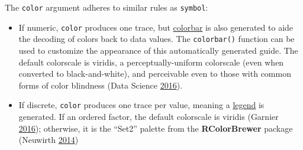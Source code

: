 \documentclass[12pt,]{isuthesis}
\newenvironment{Shaded}{\begin{snugshade}}{\end{snugshade}}
\newcommand{\KeywordTok}[1]{\textcolor[rgb]{0.13,0.29,0.53}{\textbf{{#1}}}}
\newcommand{\DataTypeTok}[1]{\textcolor[rgb]{0.13,0.29,0.53}{{#1}}}
\newcommand{\DecValTok}[1]{\textcolor[rgb]{0.00,0.00,0.81}{{#1}}}
\newcommand{\FloatTok}[1]{\textcolor[rgb]{0.00,0.00,0.81}{{#1}}}
\newcommand{\StringTok}[1]{\textcolor[rgb]{0.31,0.60,0.02}{{#1}}}
\newcommand{\OtherTok}[1]{\textcolor[rgb]{0.56,0.35,0.01}{{#1}}}
\newcommand{\NormalTok}[1]{{#1}}
\begin{document}
The \texttt{color} argument adheres to similar rules as \texttt{symbol}:

\begin{itemize}
\item
  If numeric, \texttt{color} produces one trace, but
  \href{https://plot.ly/r/reference/\#scatter-marker-colorbar}{colorbar}
  is also generated to aide the decoding of colors back to data values.
  The \texttt{colorbar()} function can be used to customize the
  appearance of this automatically generated guide. The default
  colorscale is viridis, a perceptually-uniform colorscale (even when
  converted to black-and-white), and perceivable even to those with
  common forms of color blindness (Data Science
  \protect\hyperlink{ref-viridis}{2016}).
\item
  If discrete, \texttt{color} produces one trace per value, meaning a
  \href{https://plot.ly/r/reference/\#layout-legend}{legend} is
  generated. If an ordered factor, the default colorscale is viridis
  (Garnier \protect\hyperlink{ref-viridisLite}{2016}); otherwise, it is
  the ``Set2'' palette from the \textbf{RColorBrewer} package (Neuwirth
  \protect\hyperlink{ref-RColorBrewer}{2014})
\end{itemize}

\begin{Shaded}
\end{Shaded}
\end{document}
